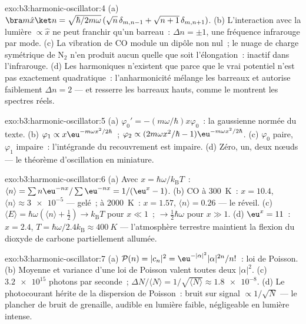 \begin{solution}{exo:b3:harmonic-oscillator:4}
(a) $\bra m\hat x\ket n = \sqrt{\hbar/2m\omega}\,(\sqrt n\,
\delta_{m,n-1} + \sqrt{n + 1}\,\delta_{m,n+1})$. (b) L'interaction
avec la lumière $\propto\hat x$ ne peut franchir qu'un barreau~: $\Delta n =
\pm1$, une fréquence infrarouge par mode. (c) La vibration de CO
module un dipôle non nul~; le nuage de charge symétrique de N$_2$ n'en
produit aucun quelle que soit l'élongation~: inactif dans
l'infrarouge. (d) Les harmoniques n'existent que parce que le vrai
potentiel n'est pas exactement quadratique~: l'anharmonicité mélange
les barreaux et autorise faiblement $\Delta n = 2$ --- et resserre les
barreaux hauts, comme le montrent les spectres réels.
\end{solution}

\begin{solution}{exo:b3:harmonic-oscillator:5}
(a) $\varphi_0' = -(m\omega/\hbar)x\varphi_0$~: la gaussienne normée du
texte. (b) $\varphi_1 \propto x\eu^{-m\omega
x^2/2\hbar}$~; $\varphi_2 \propto (2m\omega x^2/\hbar -
1)\eu^{-m\omega x^2/2\hbar}$. (c) $\varphi_0$ paire, $\varphi_1$
impaire~: l'intégrande du recouvrement est impaire. (d) Zéro, un, deux
nœuds --- le théorème d'oscillation en miniature.
\end{solution}

\begin{solution}{exo:b3:harmonic-oscillator:6}
(a) Avec $x = \hbar\omega/k_{\text{B}}T$~: $\langle n\rangle =
\sum n\eu^{-nx}/\sum\eu^{-nx} = 1/(\eu^x - 1)$. (b) CO à
\qty{300}{K}~: $x = 10.4$, $\langle n\rangle \approx \num{3e-5}$ ---
gelé~; à \qty{2000}{K}~: $x = 1.57$, $\langle n\rangle = 0.26$ ---
le réveil. (c) $\langle E\rangle = \hbar\omega(\langle n\rangle +
\tfrac12) \to k_{\text{B}}T$ pour $x \ll 1$~; $\to \tfrac12\hbar
\omega$ pour $x \gg 1$. (d) $\eu^x = 11$~: $x = 2.4$, $T =
\hbar\omega/2.4k_{\text{B}} \approx \qty{400}{K}$ --- l'atmosphère
terrestre maintient la flexion du dioxyde de carbone partiellement allumée.
\end{solution}

\begin{solution}{exo:b3:harmonic-oscillator:7}
(a) $\mathcal P(n) = |c_n|^2 = \eu^{-|\alpha|^2}|\alpha|^{2n}/n!$~:
loi de Poisson. (b) Moyenne et variance d'une loi de Poisson valent
toutes deux $|\alpha|^2$.
(c) $\num{3.2e15}$ photons par seconde~; $\Delta N/\langle N\rangle =
1/\sqrt{\langle N\rangle} \approx \num{1.8e-8}$. (d) Le
photocourant hérite de la dispersion de Poisson~: bruit sur signal
$\propto 1/\sqrt N$ --- le plancher de bruit de grenaille, audible en
lumière faible, négligeable en lumière intense.
\end{solution}

